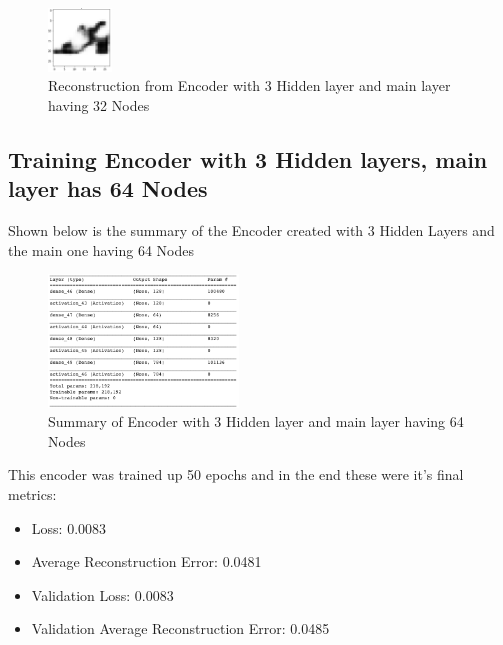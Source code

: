 \documentclass[conference]{IEEEtran}
\begin{document}
    \begin{figure}[H]
        \centering
        \captionsetup{justification=centering}
        \centering
            \includegraphics[width=0.15\textwidth]{16.png}
            \caption{Reconstruction from Encoder with 3 Hidden layer and main layer having 32 Nodes}
    \end{figure}

    \subsection{Training Encoder with 3 Hidden layers, main layer has 64 Nodes}

    Shown below is the summary of the Encoder created with 3 Hidden Layers and the main one having 64 Nodes

    \begin{figure}[H]
        \centering
        \captionsetup{justification=centering}
        \centering
            \includegraphics[width=0.45\textwidth]{17.png}
            \caption{Summary of Encoder with 3 Hidden layer and main layer having 64 Nodes}
    \end{figure}

    This encoder was trained up 50 epochs and in the end these were it's final metrics:

    \begin{itemize}
        \item Loss: 0.0083
        \item Average Reconstruction Error: 0.0481 
        \item Validation Loss: 0.0083
        \item Validation Average Reconstruction Error: 0.0485
    \end{itemize}
\end{document}
